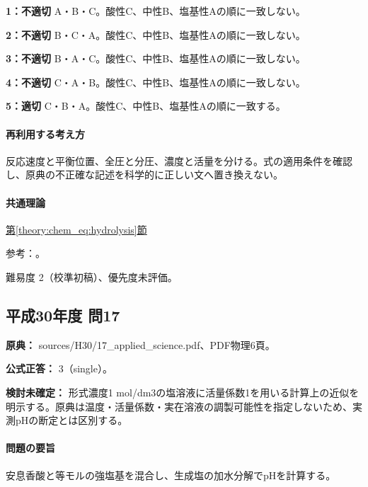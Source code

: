 \noindent\textbf{1：不適切} A・B・C。酸性C、中性B、塩基性Aの順に一致しない。\par

\noindent\textbf{2：不適切} B・C・A。酸性C、中性B、塩基性Aの順に一致しない。\par

\noindent\textbf{3：不適切} B・A・C。酸性C、中性B、塩基性Aの順に一致しない。\par

\noindent\textbf{4：不適切} C・A・B。酸性C、中性B、塩基性Aの順に一致しない。\par

\noindent\textbf{5：適切} C・B・A。酸性C、中性B、塩基性Aの順に一致する。\par

\paragraph{再利用する考え方} 反応速度と平衡位置、全圧と分圧、濃度と活量を分ける。式の適用条件を確認し、原典の不正確な記述を科学的に正しい文へ置き換えない。

\paragraph{共通理論} \hyperref[theory:chem_eq:hydrolysis]{第\ref*{theory:chem_eq:hydrolysis}節}

\par 参考：\cite{iupac_greenbook2012,mit_buffer2008}。

\par 難易度 2（校準初稿）、優先度未評価。

\subsection{平成30年度 問17}
\label{q:h30-reg-applied-17}

\noindent\textbf{原典：} sources/H30/17\_applied\_science.pdf、PDF物理6頁。

\textbf{公式正答：} 3（single）。

\par\textbf{検討未確定：} 形式濃度1 mol/dm3の塩溶液に活量係数1を用いる計算上の近似を明示する。原典は温度・活量係数・実在溶液の調製可能性を指定しないため、実測pHの断定とは区別する。

\paragraph{問題の要旨} 安息香酸と等モルの強塩基を混合し、生成塩の加水分解でpHを計算する。

